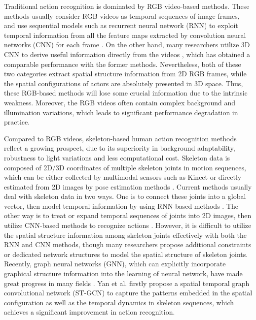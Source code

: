\documentclass[journal]{IEEEtran}
\begin{document}
Traditional action recognition is dominated by RGB video-based methods. These methods usually consider RGB videos as temporal sequences of image frames, and use sequential models such as recurrent neural network (RNN) to exploit temporal information from all the feature maps extracted by convolution neural networks (CNN) for each frame \cite{sharma2015action}. On the other hand, many researchers utilize 3D CNN to derive useful information directly from the videos \cite{tran2015learning}, which has obtained a comparable performance with the former methods. Nevertheless, both of these two categories extract spatial structure information from 2D RGB frames, while the spatial configurations of actors are absolutely presented in 3D space. Thus, these RGB-based methods will lose some crucial information due to the intrinsic weakness. Moreover, the RGB videos often contain complex background and illumination variations, which leads to significant performance degradation in practice.

Compared to RGB videos, skeleton-based human action recognition methods reflect a growing prospect, due to its superiority in background adaptability, robustness to light variations and less computational cost. Skeleton data is composed of 2D/3D coordinates of multiple skeleton joints in motion sequences, which can be either collected by multimodal sensors such as Kinect or directly estimated from 2D images by pose estimation methods \cite{cao2017realtime}. Current methods usually deal with skeleton data in two ways. One is to connect these joints into a global vector, then model temporal information by using RNN-based methods \cite{liu2016spatio, zhang2017view, lee2017ensemble, si2018skeleton}. The other way is to treat or expand temporal sequences of joints into 2D images, then utilize CNN-based methods to recognize actions \cite{li2017skeleton, soo2017interpretable, li2018co, tang2018deep}. However, it is difficult to utilize the spatial structure information among skeleton joints effectively with both the RNN and CNN methods, though many researchers propose additional constraints or dedicated network structures to model the spatial structure of skeleton joints. Recently, graph neural networks (GNN), which can explicitly incorporate graphical structure information into the learning of neural network, have made great progress in many fields \cite{kipf2016semi}. Yan et al.\cite{yan2018spatial} firstly propose a spatial temporal graph convolutional network (ST-GCN) to capture the patterns embedded in the spatial configuration as well as the temporal dynamics in skeleton sequences, which achieves a significant improvement in action recognition.
\end{document}
